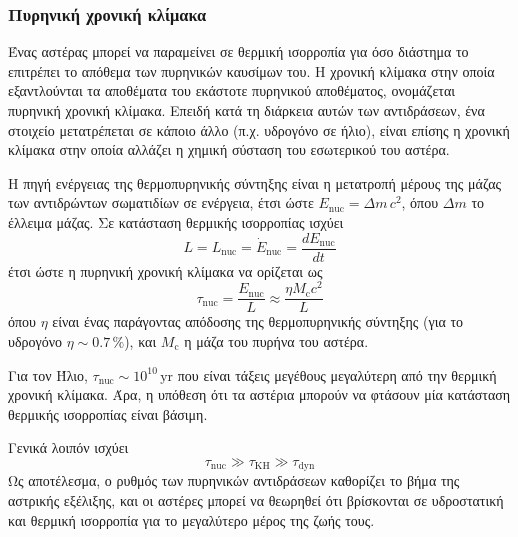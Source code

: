 \subsubsection{Πυρηνική χρονική κλίμακα}
Ένας αστέρας μπορεί να παραμείνει σε θερμική ισορροπία για όσο διάστημα το επιτρέπει το απόθεμα των πυρηνικών καυσίμων του. Η χρονική κλίμακα στην οποία εξαντλούνται τα αποθέματα του εκάστοτε πυρηνικού αποθέματος, ονομάζεται πυρηνική χρονική κλίμακα. Επειδή κατά τη διάρκεια αυτών των αντιδράσεων, ένα στοιχείο μετατρέπεται σε κάποιο άλλο (π.χ. υδρογόνο σε ήλιο), είναι επίσης η χρονική κλίμακα στην οποία αλλάζει η χημική σύσταση του εσωτερικού του αστέρα.

Η πηγή ενέργειας της θερμοπυρηνικής σύντηξης είναι η μετατροπή μέρους της μάζας των αντιδρώντων σωματιδίων σε ενέργεια, έτσι ώστε $E_{\text{nuc}} = \Delta m \,c^2$, όπου $\Delta m$ το έλλειμα μάζας.
Σε κατάσταση θερμικής ισορροπίας ισχύει
$$L = L_{\text{nuc}} = \dot{E}_{\text{nuc}} = \frac{d E_{\text{nuc}}}{dt}$$
έτσι ώστε η πυρηνική χρονική κλίμακα να ορίζεται ως
\begin{equation}
    \label{eq:nuclear_timescale}
    \tau_{\text{nuc}} = \frac{E_{\text{nuc}}}{L} \approx \frac{\eta M_{\text{c}} c^2}{L}
\end{equation}
όπου $\eta$ είναι ένας παράγοντας απόδοσης της θερμοπυρηνικής σύντηξης (για το υδρογόνο $\eta \sim 0.7 \,\%$), και $M_{\text{c}}$ η μάζα του πυρήνα του αστέρα.

Για τον Ήλιο, $\tau_{\text{nuc}} \sim 10^{10} \,\text{yr}$ που είναι τάξεις μεγέθους μεγαλύτερη από την θερμική χρονική κλίμακα. Άρα, η υπόθεση ότι τα αστέρια μπορούν να φτάσουν μία κατάσταση θερμικής ισορροπίας είναι βάσιμη.

Γενικά λοιπόν ισχύει
\begin{equation}
    \label{eq:stellar_timescales_order}
    \tau_{\text{nuc}} \gg \tau_{\text{KH}} \gg \tau_{\text{dyn}}
\end{equation}
Ως αποτέλεσμα, ο ρυθμός των πυρηνικών αντιδράσεων καθορίζει το βήμα της αστρικής εξέλιξης, και οι αστέρες μπορεί να θεωρηθεί ότι βρίσκονται σε υδροστατική και θερμική ισορροπία για το μεγαλύτερο μέρος της ζωής τους.
